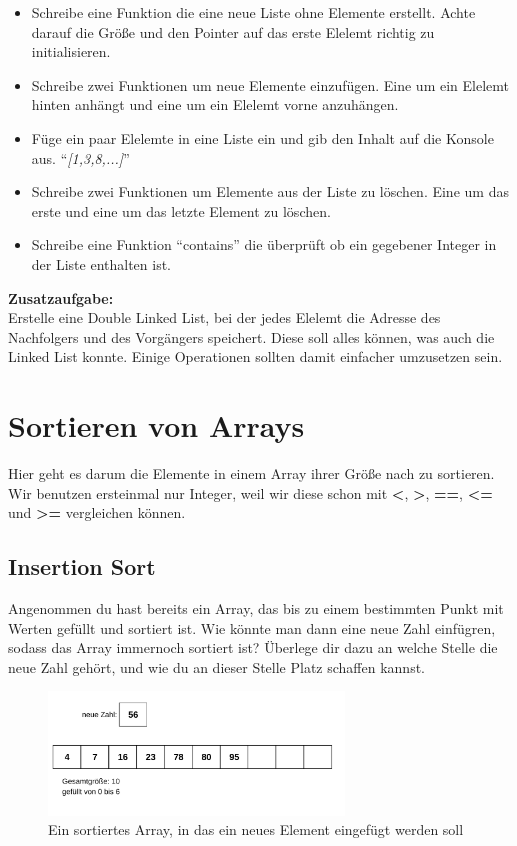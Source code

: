 \documentclass[c_worksheet.tex]{subfiles}
\begin{document}
\begin{itemize}
  \item Schreibe eine Funktion die eine neue Liste ohne Elemente erstellt. Achte darauf die Größe und den Pointer auf das erste Elelemt richtig zu initialisieren.
  \item Schreibe zwei Funktionen um neue Elemente einzufügen. Eine um ein Elelemt hinten anhängt und eine um ein Elelemt vorne anzuhängen.
  \item Füge ein paar Elelemte in eine Liste ein und gib den Inhalt auf die Konsole aus. ``\textit{[1,3,8,...]}''
  \item Schreibe zwei Funktionen um Elemente aus der Liste zu löschen. Eine um das erste und eine um das letzte Element zu löschen.
  \item Schreibe eine Funktion ``contains'' die überprüft ob ein gegebener Integer in der Liste enthalten ist.
\end{itemize}

\textbf{Zusatzaufgabe:}\\
Erstelle eine Double Linked List, bei der jedes Elelemt die Adresse des Nachfolgers und des Vorgängers speichert. Diese soll alles können, was auch die Linked List konnte. Einige Operationen sollten damit einfacher umzusetzen sein.

\section{Sortieren von Arrays}

Hier geht es darum die Elemente in einem Array ihrer Größe nach zu sortieren. Wir benutzen ersteinmal nur Integer, weil wir diese schon mit \textbf{<}, \textbf{>}, \textbf{==}, \textbf{<=} und \textbf{>=} vergleichen können.

\subsection{Insertion Sort}
Angenommen du hast bereits ein Array, das bis zu einem bestimmten Punkt mit Werten gefüllt und sortiert ist. Wie könnte man dann eine neue Zahl einfügren, sodass das Array immernoch sortiert ist? Überlege dir dazu an welche Stelle die neue Zahl gehört, und wie du an dieser Stelle Platz schaffen kannst.

\begin{figure}[h]
\centering
\includegraphics[width=0.7\textwidth]{./Grafiken/Aufgaben/insertionSort}
\caption{Ein sortiertes Array, in das ein neues Element eingefügt werden soll} 
\end{figure}
\end{document}
